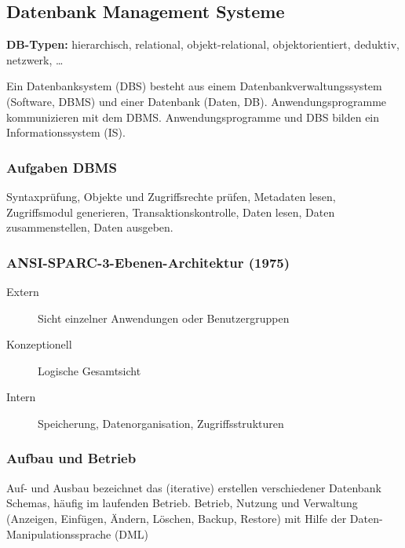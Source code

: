 \subsection{Datenbank Management Systeme}
\textbf{DB-Typen:} hierarchisch, relational, objekt-relational, objektorientiert, deduktiv, netzwerk, \dots

Ein Datenbanksystem (DBS) besteht aus einem Datenbankverwaltungssystem (Software, DBMS) und einer Datenbank (Daten, DB).
Anwendungsprogramme kommunizieren mit dem DBMS. Anwendungsprogramme und DBS bilden ein Informationssystem (IS).

\subsubsection{Aufgaben DBMS}
Syntaxprüfung, Objekte und Zugriffsrechte prüfen, Metadaten lesen, Zugriffsmodul generieren, Transaktionskontrolle,
Daten lesen, Daten zusammenstellen, Daten ausgeben.


\subsubsection{ANSI-SPARC-3-Ebenen-Architektur (1975)}
\begin{description}
 \item [Extern] Sicht einzelner Anwendungen oder Benutzergruppen
 \item [Konzeptionell] Logische Gesamtsicht
 \item [Intern] Speicherung, Datenorganisation, Zugriffsstrukturen
\end{description}

\subsubsection{Aufbau und Betrieb}
Auf- und Ausbau bezeichnet das (iterative) erstellen verschiedener Datenbank Schemas, 
häufig im laufenden Betrieb. Betrieb, Nutzung und Verwaltung (Anzeigen, Einfügen, Ändern, Löschen, Backup, Restore)
mit Hilfe der Daten-Manipulationssprache (DML)
